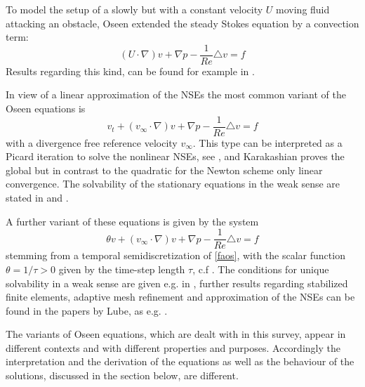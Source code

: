 \documentclass[a4paper,10pt,BCOR=15mm]{scrbook}
\begin{document}
To model the setup of a slowly but with a constant velocity $U$ moving fluid attacking an obstacle, Oseen \cite{osee} extended the steady Stokes equation by a convection term: 
\begin{equation}\label{orios}
 (U \cdot \nabla) v+\nabla p - \frac{1}{Re} \triangle v =   f 
\end{equation}
Results regarding this kind, can be found for example in \cite{gald,lalifl}. 

In view of a linear approximation of the NSEs the most common variant of the Oseen equations is
\begin{equation}\label{faos}
 v_t +  (v_\infty \cdot \nabla) v+\nabla p - \frac{1}{Re} \triangle v =   f
\end{equation}
with a divergence free reference velocity $v_\infty$. This type can be interpreted as a Picard iteration to solve the nonlinear NSEs, see \cite[p.~326]{elma}, and Karakashian \cite{kara} proves the global but in contrast to the quadratic for the Newton scheme only linear convergence. The solvability of the stationary equations in the weak sense are stated in \cite[p. 282]{roos} and \cite[p. 108]{layt}.

A further variant of these equations is given by the system 
\begin{equation}\label{luos}
 \theta v +(v_\infty \cdot \nabla) v+ \nabla p - \frac{1}{Re} \triangle v =   f
\end{equation}
stemming from a temporal semidiscretization of \eqref{faos}, with the scalar function $\theta = 1/\tau > 0$ given by the time-step length $\tau$, c.f \cite{olsh}.  The conditions for unique solvability in a weak sense are given e.g. in \cite{cokasc}, further results regarding stabilized finite elements, adaptive mesh refinement and approximation of the NSEs can be found in the papers by Lube, as e.g. \cite{lube1,lube3,lube2,lube4}. 

The variants of Oseen equations, which are dealt with in this survey, appear in different contexts and with different properties and purposes. Accordingly the interpretation and the derivation of the equations as well as the behaviour of the solutions, discussed in the section below, are different.
\end{document}
